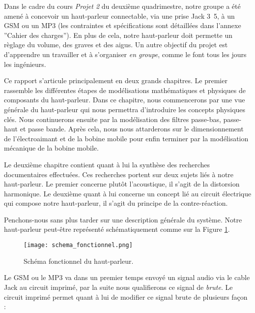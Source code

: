 

Dans le cadre du cours \textit{Projet 2} du deuxième quadrimestre, notre groupe a été amené à 
concevoir un haut-parleur connectable, via une prise Jack \unit{3.5}{\milli\meter}, à un 
GSM ou un MP3 (les contraintes et spécifications sont détaillées dans l'annexe ''Cahier des charges''). 
En plus de cela, notre haut-parleur doit permette un règlage du volume, des graves
et des aigus. Un autre objectif du projet est d'apprendre un travailler et à s'organiser \textit{en groupe}, 
comme le font tous les jours les ingénieurs.

Ce rapport s'articule principalement en deux grands chapitres. Le premier
rassemble les différentes étapes de modélisations mathématiques
et physiques de composants du haut-parleur. Dans ce chapitre, nous 
commencerons par une vue générale du haut-parleur qui nous
permettra d'introduire les concepts physiques clés. Nous continuerons
ensuite par la modélisation des filtres passe-bas, passe-haut et passe bande.
Après cela, nous nous attarderons  sur le dimensionnement de l'électroaimant et
de la bobine mobile pour enfin terminer par la modélisation mécanique de la bobine
mobile.

Le deuxième chapitre contient quant à lui la synthèse des recherches documentaires
effectuées. Ces recherches portent sur deux sujets liés à notre haut-parleur. Le premier
concerne plutôt l'acoustique, il s'agit de la 
distorsion harmonique. Le deuxième quant à lui concerne un concept lié au circuit électrique qui
compose notre haut-parleur, il s'agit du principe de la contre-réaction.

Penchons-nous sans plus tarder sur une description générale du système. Notre haut-parleur
peut-être représenté schématiquement comme sur la Figure \ref{block-diagram-hp}.

\begin{figure}[!htb]
	\centering
	\texttt{[image: schema\_fonctionnel.png]}
	\caption{Schéma fonctionnel du haut-parleur.}
	\label{block-diagram-hp}
\end{figure}

Le GSM ou le MP3 va dans un premier temps envoyé un signal audio via le cable Jack au circuit
imprimé, par la suite nous qualifierons ce signal de \textit{brute}. Le circuit imprimé permet
quant à lui de modifier ce signal brute de plusieurs façon : 

